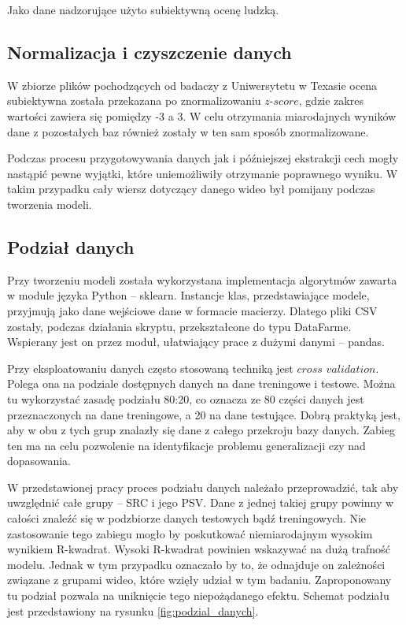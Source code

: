Jako dane nadzorujące użyto subiektywną ocenę ludzką.\par

\subsection{Normalizacja i czyszczenie danych}
W zbiorze plików pochodzących od badaczy z Uniwersytetu w Texasie ocena subiektywna została przekazana po znormalizowaniu $z$-$score$, gdzie zakres wartości zawiera się pomiędzy -3 a 3. W celu otrzymania miarodajnych wyników dane z pozostałych baz również zostały w ten sam sposób znormalizowane.\par
Podczas procesu przygotowywania danych jak i późniejszej ekstrakcji cech mogły nastąpić pewne wyjątki, które uniemożliwiły otrzymanie poprawnego wyniku. W takim przypadku cały wiersz dotyczący danego wideo był pomijany podczas tworzenia modeli.

\subsection{Podział danych}

Przy tworzeniu modeli została wykorzystana implementacja algorytmów zawarta w module języka Python -- sklearn. Instancje klas, przedstawiające modele, przyjmują jako dane wejściowe dane w formacie macierzy. Dlatego pliki CSV zostały, podczas działania skryptu, przekształcone do typu DataFarme. Wspierany jest on przez moduł, ułatwiający prace z dużymi danymi -- pandas.\par

Przy eksploatowaniu danych często stosowaną techniką jest $cross$ $validation$. Polega ona na podziale dostępnych danych na dane treningowe i testowe. Można tu wykorzystać zasadę podziału 80:20, co oznacza ze 80 części danych jest przeznaczonych na dane treningowe, a 20 na dane testujące. Dobrą praktyką jest, aby w obu z tych grup znalazły się dane z całego przekroju bazy danych. Zabieg ten ma na celu pozwolenie na identyfikacje  problemu generalizacji czy nad dopasowania. 

W przedstawionej pracy proces podziału danych należało przeprowadzić, tak aby uwzględnić  całe grupy --  SRC i jego PSV. Dane z jednej takiej grupy powinny w całości znaleźć się w podzbiorze danych testowych bądź treningowych. Nie zastosowanie tego zabiegu mogło by poskutkować niemiarodajnym wysokim wynikiem R-kwadrat. Wysoki R-kwadrat powinien wskazywać na dużą trafność modelu. Jednak w tym przypadku oznaczało by to, że odnajduje on zależności związane z grupami wideo, które wzięły udział w tym badaniu. Zaproponowany tu podział pozwala na uniknięcie tego niepożądanego efektu. Schemat podziału jest przedstawiony na rysunku \ref{fig:podzial_danych}.

